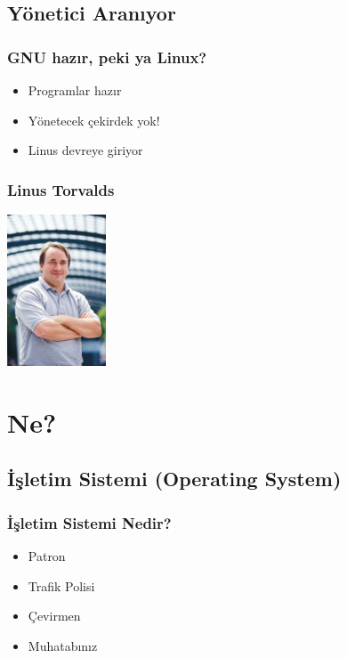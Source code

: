\documentclass{beamer}
\begin{document}
	\subsection{Yönetici Aranıyor}
		\begin{frame}
		 	\frametitle{GNU hazır, peki ya Linux?}
				\begin{itemize}[<+->]
				\item Programlar hazır
				\item Yönetecek çekirdek yok!
				\item Linus devreye giriyor
				\end{itemize}
		\end{frame}
		\begin{frame}
		 	\frametitle{Linus Torvalds}
				\begin{center}
					\includegraphics{img/linus.jpg}
				\end{center}
		\end{frame}
		



\section{Ne?}
	\subsection{İşletim Sistemi (Operating System)}
		\begin{frame}
			\frametitle{İşletim Sistemi Nedir?}
			\begin{itemize}[<+->]
			 \item Patron
			 \item Trafik Polisi 
			 \item Çevirmen
			 \item Muhatabınız 
			\end{itemize}

		\end{frame}
\end{document}
